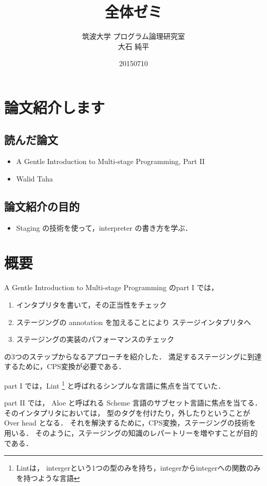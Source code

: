 \documentclass[10pt,a4paper]{jarticle}
\title {\vspace{-3cm}全体ゼミ}
\date{20150710}
\author{筑波大学 プログラム論理研究室 \\ 大石 純平}
\theoremstyle{definition}
\begin{document}
\maketitle


\section{論文紹介します}

\subsection*{読んだ論文}
\begin{itemize}
\item A Gentle Introduction to Multi-stage Programming, Part II
\item Walid Taha
\end{itemize}

\subsection*{論文紹介の目的}
\begin{itemize}
\item Staging の技術を使って，interpreter の書き方を学ぶ．
\end{itemize}

\section{概要}
A Gentle Introduction to Multi-stage Programming のpart I では，

\begin{enumerate}
\item インタプリタを書いて，その正当性をチェック
\item ステージングの annotation を加えることにより ステージインタプリタへ
\item ステージングの実装のパフォーマンスのチェック
\end{enumerate}
の3つのステップからなるアプローチを紹介した．
満足するステージングに到達するために，CPS変換が必要である．

part I では，Lint \footnote{Lintは， intergerという1つの型のみを持ち，integerからintegerへの関数のみを持つような言語} と呼ばれるシンプルな言語に焦点を当てていた．

part II では， Aloe と呼ばれる Scheme 言語のサブセット言語に焦点を当てる．
そのインタプリタにおいては，
型のタグを付けたり，外したりということが Over head となる．
それを解決するために，CPS変換，ステージングの技術を用いる．
そのように，ステージングの知識のレパートリーを増やすことが目的である．
\end{document}
